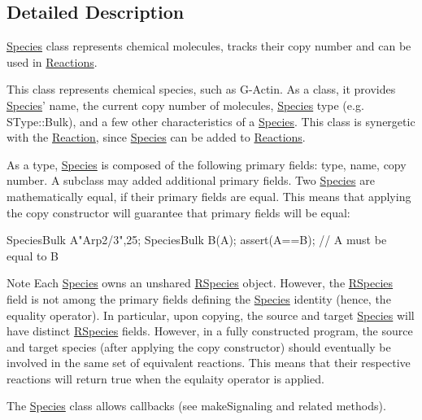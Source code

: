 \subsection{Detailed Description}
\hyperlink{classchem_1_1Species}{Species} class represents chemical molecules, tracks their copy number and can be used in \hyperlink{classchem_1_1Reaction}{Reactions}. 

This class represents chemical species, such as G-\/\-Actin. As a class, it provides \hyperlink{classchem_1_1Species}{Species}' name, the current copy number of molecules, \hyperlink{classchem_1_1Species}{Species} type (e.\-g. S\-Type\-::\-Bulk), and a few other characteristics of a \hyperlink{classchem_1_1Species}{Species}. This class is synergetic with the \hyperlink{classchem_1_1Reaction}{Reaction}, since \hyperlink{classchem_1_1Species}{Species} can be added to \hyperlink{classchem_1_1Reaction}{Reactions}.

As a type, \hyperlink{classchem_1_1Species}{Species} is composed of the following primary fields\-: type, name, copy number. A subclass may added additional primary fields. Two \hyperlink{classchem_1_1Species}{Species} are mathematically equal, if their primary fields are equal. This means that applying the copy constructor will guarantee that primary fields will be equal\-: 
\begin{DoxyCode}
  SpeciesBulk A{"Arp2/3",25};
  SpeciesBulk B(A);
  assert(A==B); // A must be equal to B
\end{DoxyCode}


\begin{DoxyNote}{Note}
Each \hyperlink{classchem_1_1Species}{Species} owns an unshared \hyperlink{classchem_1_1RSpecies}{R\-Species} object. However, the \hyperlink{classchem_1_1RSpecies}{R\-Species} field is not among the primary fields defining the \hyperlink{classchem_1_1Species}{Species} identity (hence, the equality operator). In particular, upon copying, the source and target \hyperlink{classchem_1_1Species}{Species} will have distinct \hyperlink{classchem_1_1RSpecies}{R\-Species} fields. However, in a fully constructed program, the source and target species (after applying the copy constructor) should eventually be involved in the same set of equivalent reactions. This means that their respective reactions will return true when the equlaity operator is applied.

The \hyperlink{classchem_1_1Species}{Species} class allows callbacks (see make\-Signaling and related methods). 
\end{DoxyNote}


